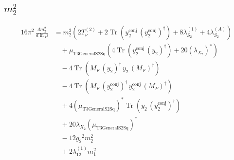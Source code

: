 \documentclass[10pt,a4paper]{article}
\begin{document}
\subsection*{$m_2^2$}
\begin{align*}
16\pi^2\,\frac{d m_2^2}{d\ln\mu} &={m_2^2} (2 T_{\nu}^{(2)}+2 \operatorname{Tr}\!\left({y_{2}^{\mathrm{conj}}}\,\left({y_{2}^{\mathrm{conj}}}\right)^{\dagger}\right)+8 {\lambda_{S_2}^{(1)}}+4 {\lambda_{S_2}^{(A)}}) \\
&\quad +{\mu_{\mathrm{T3GeneralS2Sq}}} (4 \operatorname{Tr}\!\left({y_{2}^{\mathrm{conj}}}\,\left({y_2}\right)^{\dagger}\right)+20 \left({\lambda_{X_{2}}}\right)^{*}) \\
&\quad -4 \operatorname{Tr}\!\left({M_F}\,\left({y_2}\right)^{\dagger}\,{y_2}\,\left({M_F}\right)^{\dagger}\right) \\
&\quad -4 \operatorname{Tr}\!\left({M_F}\,\left({y_{2}^{\mathrm{conj}}}\right)^{\dagger}\,{y_{2}^{\mathrm{conj}}}\,\left({M_F}\right)^{\dagger}\right) \\
&\quad +4 \left({\mu_{\mathrm{T3GeneralS2Sq}}}\right)^{*} \operatorname{Tr}\!\left({y_2}\,\left({y_{2}^{\mathrm{conj}}}\right)^{\dagger}\right) \\
&\quad +20 {\lambda_{X_{2}}} \left({\mu_{\mathrm{T3GeneralS2Sq}}}\right)^{*} \\
&\quad -12 {g_2}^2 {m_2^2} \\
&\quad +2 {\lambda_{12}^{(1)}} {m_1^2} \\
\end{align*}
\end{document}
